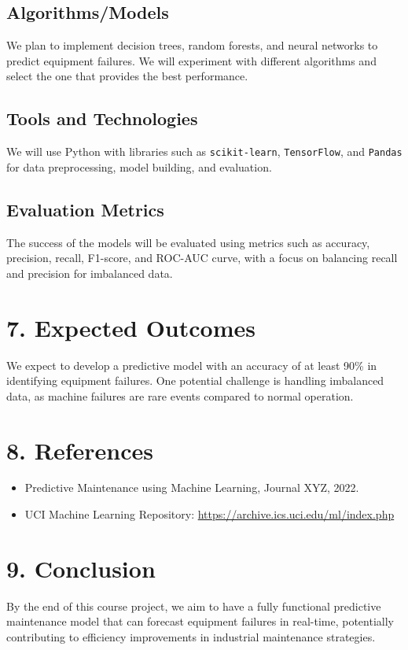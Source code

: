 \documentclass{article}
\begin{document}
\subsection*{Algorithms/Models}
We plan to implement decision trees, random forests, and neural networks to predict equipment failures. We will experiment with different algorithms and select the one that provides the best performance.

\subsection*{Tools and Technologies}
We will use Python with libraries such as \texttt{scikit-learn}, \texttt{TensorFlow}, and \texttt{Pandas} for data preprocessing, model building, and evaluation.

\subsection*{Evaluation Metrics}
The success of the models will be evaluated using metrics such as accuracy, precision, recall, F1-score, and ROC-AUC curve, with a focus on balancing recall and precision for imbalanced data.

\section*{7. Expected Outcomes}
We expect to develop a predictive model with an accuracy of at least 90\% in identifying equipment failures. One potential challenge is handling imbalanced data, as machine failures are rare events compared to normal operation.

\section*{8. References}
\begin{itemize}
    \item Predictive Maintenance using Machine Learning, Journal XYZ, 2022.
    \item UCI Machine Learning Repository: \url{https://archive.ics.uci.edu/ml/index.php}
\end{itemize}

\section*{9. Conclusion}
By the end of this course project, we aim to have a fully functional predictive maintenance model that can forecast equipment failures in real-time, potentially contributing to efficiency improvements in industrial maintenance strategies.
\end{document}

